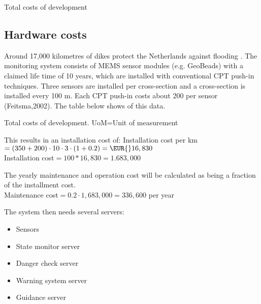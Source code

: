 \begin{table}[H]
	\pgfplotstabletypeset[
		Costs
	]\tdevcost
\caption{Total costs of development}
\label{table:total-dev-costs}
\end{table}

\subsection{Hardware costs}
Around 17,000 kilometres of dikes protect the Netherlands against flooding \cite{DMC}. 
The monitoring system consists of MEMS sensor modules (e.g. GeoBeads) with a claimed life time of 10 years, which are installed with conventional CPT push-in techniques. Three sensors are installed per cross-section and a cross-section is installed every 100 m.
Each CPT push-in costs about \EUR{}200 per sensor (Feitsma,2002)\cite{TUDelftPHD}.%
The table below shows of this data.
\begin{table}[H]
\caption{Total costs of development. UoM=Unit of measurement}
\label{table:installationdata}
\end{table}

This results in an installation cost of:
Installation cost per km$=(350+200)\cdot10\cdot3\cdot(1+0.2)=\EUR{}16,830$\\
Installation cost$=100*16,830=1.683,000$

\newcommand{\installationCosts}{1.683.000}

The yearly maintenance and operation cost will be calculated as being a fraction of the installment cost.\\ 
Maintenance cost$=0.2\cdot1,683,000=336,600$ per year %

The system then needs several servers:
\begin{itemize}
	\item Sensors
	\item {State monitor server}
	\item {Danger check server}	
	\item {Warning system server}	
	\item {Guidance server}	
\end{itemize}

